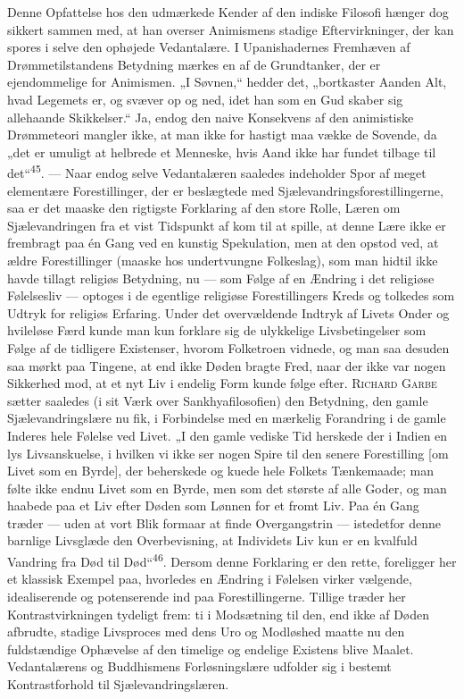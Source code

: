 \documentclass[12pt,a4paper,openany]{book}
\newcommand{\opage}[1]{\marginnote{\footnotesize\textit{[#1]}}}
\begin{document}
Denne Opfattelse hos den udmærkede Kender af den indiske Filosofi hænger
dog sikkert sammen med, at han overser Animismens stadige
Eftervirkninger, der kan spores i selve den ophøjede Vedantalære. I
Upanishadernes Fremhæven af Drømmetilstandens Betydning mærkes en af de
Grundtanker, der er ejendommelige for Animismen. „I Søvnen,“ hedder det,
„bortkaster Aanden Alt, hvad Legemets er, og svæver op og ned, idet han
som en Gud skaber sig allehaande Skikkelser.“ Ja, endog den naive
Konsekvens af den animistiske Drømmeteori mangler ikke, at man ikke for
hastigt maa vække de Sovende, da „det er umuligt at helbrede et
Menneske, hvis Aand ikke har fundet tilbage til
det“\textsuperscript{45}. --- Naar endog selve Vedantalæren saaledes
indeholder Spor af meget elementære Forestillinger, der er beslægtede
med Sjælevandringsforestillingerne, saa er det maaske den rigtigste
Forklaring af den store Rolle, Læren om Sjælevandringen fra et vist
Tidspunkt af kom til at spille, at denne Lære ikke er frembragt paa én
Gang ved en kunstig Spekulation, men at
\opage{99}den opstod ved, at ældre Forestillinger (maaske hos
undertvungne Folkeslag), som man hidtil ikke havde tillagt religiøs
Betydning, nu --- som Følge af en Ændring i det religiøse Følelsesliv
--- optoges i de egentlige religiøse Forestillingers Kreds og tolkedes
som Udtryk for religiøs Erfaring. Under det overvældende Indtryk af
Livets Onder og hvileløse Færd kunde man kun forklare sig de ulykkelige
Livsbetingelser som Følge af de tidligere Existenser, hvorom Folketroen
vidnede, og man saa desuden saa mørkt paa Tingene, at end ikke Døden
bragte Fred, naar der ikke var nogen Sikkerhed mod, at et nyt Liv i
endelig Form kunde følge efter. \textsc{Richard Garbe} sætter saaledes
(i sit Værk over Sankhyafilosofien) den Betydning, den gamle
Sjælevandringslære nu fik, i Forbindelse med en mærkelig Forandring i de
gamle Inderes hele Følelse ved Livet. „I den gamle vediske Tid herskede
der i Indien en lys Livsanskuelse, i hvilken vi ikke ser nogen Spire til
den senere Forestilling [om Livet som en Byrde], der beherskede og kuede
hele Folkets Tænkemaade; man følte ikke endnu Livet som en Byrde, men
som det største af alle Goder, og man haabede paa et Liv efter Døden som
Lønnen for et fromt Liv. Paa én Gang træder --- uden at vort Blik
formaar at finde Overgangstrin --- istedetfor denne barnlige Livsglæde
den Overbevisning, at Individets Liv kun er en kvalfuld Vandring fra Død
til Død“\textsuperscript{46}. Dersom denne Forklaring er den rette,
foreligger her et klassisk Exempel paa, hvorledes en Ændring i Følelsen
virker vælgende, idealiserende og potenserende ind paa Forestillingerne.
Tillige træder her Kontrastvirkningen tydeligt frem: ti i Modsætning til
den, end ikke af Døden afbrudte, stadige Livsproces med dens Uro og
Modløshed maatte nu den fuldstændige Ophævelse af den timelige og
endelige Existens blive Maalet. Vedantalærens og Buddhismens
Forløsningslære udfolder sig i bestemt Kontrastforhold til
Sjælevandringslæren.
\end{document}
